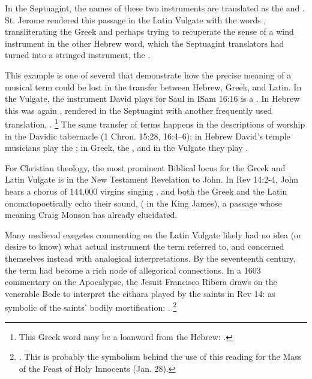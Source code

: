 In the Septuagint, the names of these two instruments are translated as the
 and .
St. Jerome rendered this passage in the Latin Vulgate with the words
, transliterating the Greek  and perhaps trying to recuperate the sense of a wind instrument in the other Hebrew word, which the Septuagint translators had turned into a stringed instrument, the .

This example is one of several that demonstrate how the precise meaning of a musical term could be lost in the transfer between Hebrew, Greek, and Latin.
In the Vulgate, the instrument David plays for Saul in ISam 16:16 is a .
In Hebrew this was again , rendered in the Septuagint with another
frequently used translation, .%
	\footnote{%
	This Greek word may be a loanword from the Hebrew: \autocite{Brown:HebrewOTLexicon}{}.
	}
The same transfer of terms happens in the descriptions of worship in the Davidic
tabernacle (1 Chron. 15:28, 16:4--6): in Hebrew David's temple musicians play
the ; in Greek, the , and in the Vulgate they
play .%

For Christian theology, the most prominent Biblical locus for the Greek
 and Latin Vulgate  is in the New Testament Revelation to John.
In Rev 14:2-4, John hears a chorus of 144,000 virgins singing , and both the Greek and the Latin onomatopoetically echo
their sound,  ( in the King James), a passage whose meaning Craig Monson has already elucidated.%
	\autocite[88--95]{Monson:DivasConvent}

Many medieval exegetes commenting on the Latin Vulgate likely had no idea (or desire to know) what actual instrument the term  referred to, and concerned themselves instead with analogical interpretations.
By the seventeenth century, the term had become a rich node of allegorical connections.
In a 1603 commentary on the Apocalypse, the Jesuit Francisco Ribera draws on the venerable Bede to interpret the cithara played by the saints in Rev 14: as symbolic of the saints' bodily mortification: 
.%
	\footnote{
	\autocite[429]{Ribera:Apocalypse}.
This is probably the symbolism behind the use of this reading for the Mass of the Feast of Holy Innocents (Jan. 28).
	} 

